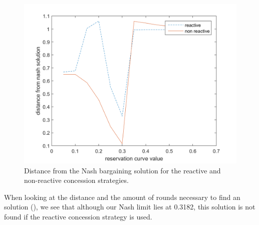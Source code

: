 \begin{figure}[h]
	\centering
	\includegraphics[width=0.7\linewidth]{img/reactivevsnonreactive}
	\caption{Distance from the Nash bargaining solution for the reactive and non-reactive concession strategies. }
	\label{fig:reactivevsnon-reactive}
\end{figure}

When looking at the distance and the amount of rounds necessary to find an solution (), we see that although our Nash limit lies at 0.3182, this solution is not found if the reactive concession strategy is used. 

